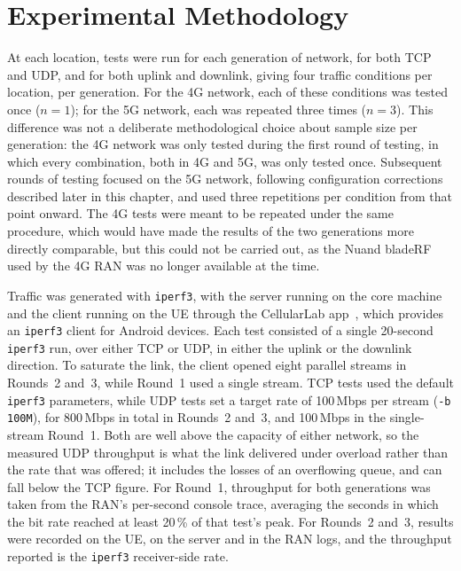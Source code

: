 \newpage

\section{Experimental Methodology}
\label{sec:experimental-methodology}
At each location, tests were run for each generation of network, for both TCP and UDP, and for both uplink and downlink, giving four traffic conditions per location, per generation. For the 4G network, each of these conditions was tested once ($n=1$); for the 5G network, each was repeated three times ($n=3$). This difference was not a deliberate methodological choice about sample size per generation: the 4G network was only tested during the first round of testing, in which every combination, both in 4G and 5G, was only tested once. Subsequent rounds of testing focused on the 5G network, following configuration corrections described later in this chapter, and used three repetitions per condition from that point onward. The 4G tests were meant to be repeated under the same procedure, which would have made the results of the two generations more directly comparable, but this could not be carried out, as the Nuand bladeRF used by the 4G \gls{RAN} was no longer available at the time.

Traffic was generated with \texttt{iperf3}, with the server running on the core machine and the client running on the \gls{UE} through the CellularLab app~\cite{cellularlab}, which provides an \texttt{iperf3} client for Android devices. Each test consisted of a single 20-second \texttt{iperf3} run, over either TCP or UDP, in either the uplink or the downlink direction. To saturate the link, the client opened eight parallel streams in Rounds~2 and~3, while Round~1 used a single stream. TCP tests used the default \texttt{iperf3} parameters, while UDP tests set a target rate of 100\,Mbps per stream (\texttt{-b 100M}), for 800\,Mbps in total in Rounds~2 and~3, and 100\,Mbps in the single-stream Round~1. Both are well above the capacity of either network, so the measured UDP throughput is what the link delivered under overload rather than the rate that was offered; it includes the losses of an overflowing queue, and can fall below the TCP figure. For Round~1, throughput for both generations was taken from the \gls{RAN}'s per-second console trace, averaging the seconds in which the bit rate reached at least 20\,\% of that test's peak. For Rounds~2 and~3, results were recorded on the \gls{UE}, on the server and in the \gls{RAN} logs, and the throughput reported is the \texttt{iperf3} receiver-side rate.


